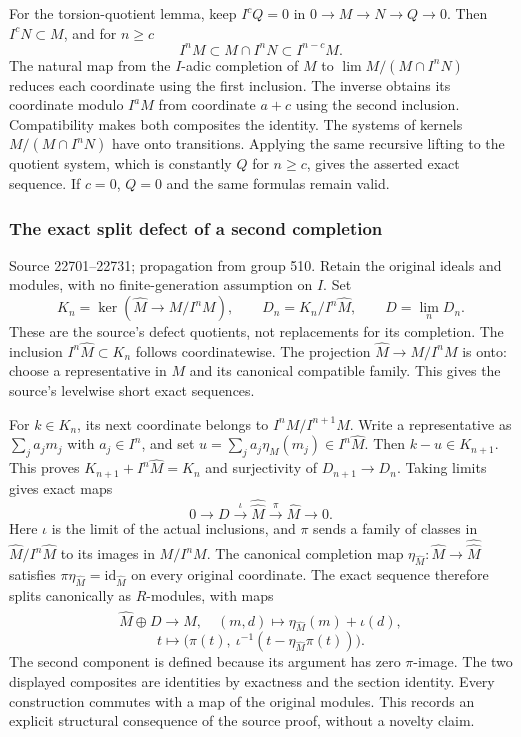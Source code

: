 For the torsion-quotient lemma, keep \(I^cQ=0\) in \(0\to M\to N\to Q\to0\). Then \(I^cN\subset M\), and for \(n\geq c\) \[
I^nM\subset M\cap I^nN\subset I^{n-c}M.
\] The natural map from the \(I\)-adic completion of \(M\) to \(\lim M/(M\cap I^nN)\) reduces each coordinate using the first inclusion. The inverse obtains its coordinate modulo \(I^aM\) from coordinate \(a+c\) using the second inclusion. Compatibility makes both composites the identity. The systems of kernels \(M/(M\cap I^nN)\) have onto transitions. Applying the same recursive lifting to the quotient system, which is constantly \(Q\) for \(n\geq c\), gives the asserted exact sequence. If \(c=0\), \(Q=0\) and the same formulas remain valid.

\subsubsection{The exact split defect of a second completion}\label{algebra-proof-014-the-exact-split-defect-of-a-second-completion}

Source 22701--22731; propagation from group 510. Retain the original ideals and modules, with no finite-generation assumption on \(I\). Set \[
K_n=\ker(\widehat M\to M/I^nM),\qquad
D_n=K_n/I^n\widehat M,\qquad D=\lim_nD_n .
\] These are the source's defect quotients, not replacements for its completion. The inclusion \(I^n\widehat M\subset K_n\) follows coordinatewise. The projection \(\widehat M\to M/I^nM\) is onto: choose a representative in \(M\) and its canonical compatible family. This gives the source's levelwise short exact sequences.

For \(k\in K_n\), its next coordinate belongs to \(I^nM/I^{n+1}M\). Write a representative as \(\sum_j a_jm_j\) with \(a_j\in I^n\), and set \(u=\sum_j a_j\eta_M(m_j)\in I^n\widehat M\). Then \(k-u\in K_{n+1}\). This proves \(K_{n+1}+I^n\widehat M=K_n\) and surjectivity of \(D_{n+1}\to D_n\). Taking limits gives exact maps \[
0\longrightarrow D\xrightarrow{\iota}
  \widehat{\widehat M}\xrightarrow{\pi}\widehat M
  \longrightarrow0.
\] Here \(\iota\) is the limit of the actual inclusions, and \(\pi\) sends a family of classes in \(\widehat M/I^n\widehat M\) to its images in \(M/I^nM\). The canonical completion map \(\eta_{\widehat M}:\widehat M\to\widehat{\widehat M}\) satisfies \(\pi\eta_{\widehat M}=\mathrm{id}_{\widehat M}\) on every original coordinate. The exact sequence therefore splits canonically as \(R\)-modules, with maps \[
\widehat M\oplus D\longrightarrow\widehat{\widehat M},
\quad (m,d)\longmapsto\eta_{\widehat M}(m)+\iota(d),
\] \[
t\longmapsto
 \bigl(\pi(t),\ \iota^{-1}(t-\eta_{\widehat M}\pi(t))\bigr).
\] The second component is defined because its argument has zero \(\pi\)-image. The two displayed composites are identities by exactness and the section identity. Every construction commutes with a map of the original modules. This records an explicit structural consequence of the source proof, without a novelty claim.

